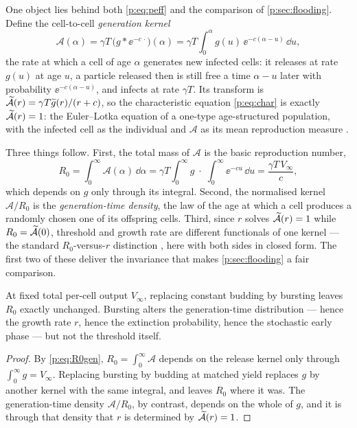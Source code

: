 One object lies behind both \cref{p:eq:peff} and the comparison of
\cref{p:sec:flooding}. Define the cell-to-cell \emph{generation kernel}
\begin{equation}
\mathcal A(\alpha)
=\gamma T\,\bigl(g*\ee^{-c\,\cdot}\bigr)(\alpha)
=\gamma T\!\int_0^\alpha g(u)\,\ee^{-c(\alpha-u)}\,\dd u,
\label{p:eq:genkernel}
\end{equation}
the rate at which a cell of age $\alpha$ generates new infected cells: it
releases at rate $g(u)$ at age $u$, a particle released then is still free a
time $\alpha-u$ later with probability $\ee^{-c(\alpha-u)}$, and infects at
rate $\gamma T$. Its transform is
$\widetilde{\mathcal A}(r)=\gamma T\widetilde{g}(r)/(r+c)$, so the characteristic
equation \cref{p:eq:char} is exactly $\widetilde{\mathcal A}(r)=1$: the
Euler--Lotka equation of a one-type age-structured population, with the
infected cell as the individual and $\mathcal A$ as its mean reproduction
measure \cite{diekmann1990definition,metz1986dynamics}.

Three things follow. First, the total mass of $\mathcal A$ is the basic
reproduction number,
\begin{equation}
R_0=\int_0^\infty\mathcal A(\alpha)\,\dd\alpha
=\gamma T\int_0^\infty g\;\cdot\;\int_0^\infty\ee^{-cu}\,\dd u
=\frac{\gamma T\,V_\infty}{c},
\label{p:eq:R0gen}
\end{equation}
which depends on $g$ only through its integral. Second, the normalised
kernel $\mathcal A/R_0$ is the \emph{generation-time density}, the law of
the age at which a cell produces a randomly chosen one of its offspring
cells. Third, since $r$ solves $\widetilde{\mathcal A}(r)=1$ while
$R_0=\widetilde{\mathcal A}(0)$, threshold and growth rate are different
functionals of one kernel --- the standard $R_0$-versus-$r$ distinction
\cite{wallinga2007generation}, here with both sides in closed form. The
first two of these deliver the invariance that makes
\cref{p:sec:flooding} a fair comparison.

\begin{theorem}
\label{p:thm:R0inv}
At fixed total per-cell output $V_\infty$, replacing constant budding by
bursting leaves $R_0$ exactly unchanged. Bursting alters the generation-time
distribution --- hence the growth rate $r$, hence the extinction
probability, hence the stochastic early phase --- but not the threshold
itself.
\end{theorem}

\begin{proof}
By \cref{p:eq:R0gen}, $R_0=\int_0^\infty\mathcal A$ depends on the release
kernel only through $\int_0^\infty g=V_\infty$. Replacing bursting by
budding at matched yield replaces $g$ by another kernel with the same
integral, and leaves $R_0$ where it was. The generation-time density
$\mathcal A/R_0$, by contrast, depends on the whole of $g$, and it is
through that density that $r$ is determined by $\widetilde{\mathcal A}(r)=1$.
\end{proof}

